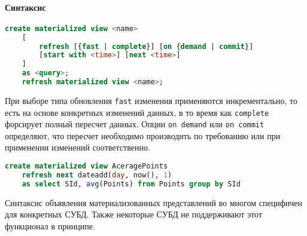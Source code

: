 \paragraph{Синтаксис}
\enewline

\begin{lstlisting}[language=SQL]
    create materialized view <name>
    [
        refresh [{fast | complete}] [on {demand | commit}]
        [start with <time>] [next <time>]
    ]
    as <query>;
    refresh materialized view <name>;
\end{lstlisting}

При выборе типа обновления \texttt{fast} изменения применяются инкрементально, то есть на
основе конкретных изменений данных, в то время как \texttt{complete} форсирует полный пересчет
данных. Опции \texttt{on demand} или \texttt{on commit} определяют, что пересчет необходимо
производить по требованию или при применении изменений соответственно.

\begin{example}
	\enewline
	\begin{lstlisting}[language=SQL]
    create materialized view AceragePoints
    refresh next dateadd(day, now(), 1)
    as select SId, avg(Points) from Points group by SId
    \end{lstlisting}
\end{example}

\begin{remark}
	Синтаксис объявления материализованных представлений во многом специфичен для конкретных СУБД.
	Также некоторые СУБД не поддерживают этот функционал в принципе.
\end{remark}
